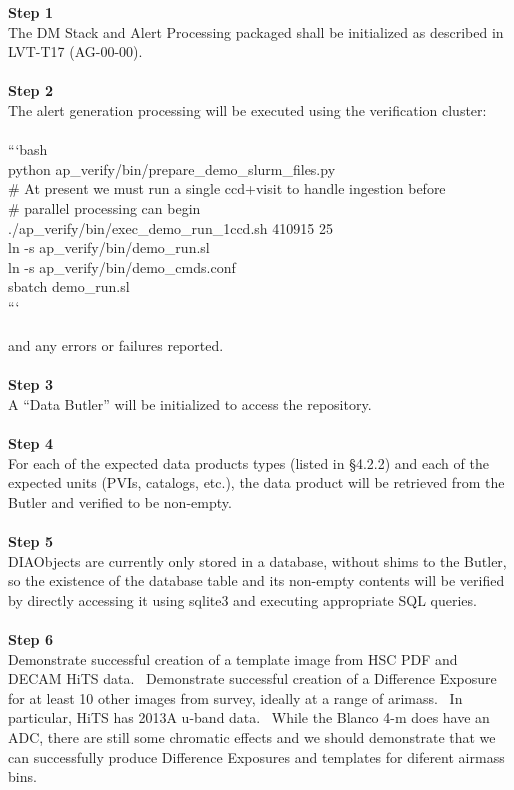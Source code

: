 \textbf{Step 1}\\
The DM Stack and Alert Processing packaged shall be initialized as
described in LVT-T17 (AG-00-00).\\
~\\
\textbf{Step 2}\\
The alert generation processing will be executed using the verification
cluster:\\
~\\
```bash\\
python ap\_verify/bin/prepare\_demo\_slurm\_files.py\\
\# At present we must run a single ccd+visit to handle ingestion
before\\
\# parallel processing can begin\\
./ap\_verify/bin/exec\_demo\_run\_1ccd.sh 410915 25\\
ln -s ap\_verify/bin/demo\_run.sl\\
ln -s ap\_verify/bin/demo\_cmds.conf\\
sbatch demo\_run.sl\\
```\\
~\\
and any errors or failures reported.\\
~\\
\textbf{Step 3}\\
A ``Data Butler'' will be initialized to access the repository.\\
~\\
\textbf{Step 4}\\
For each of the expected data products types (listed in §4.2.2) and each
of the expected units (PVIs, catalogs, etc.), the data product will be
retrieved from the Butler and verified to be non-empty.\\
~\\
\textbf{Step 5}\\
DIAObjects are currently only stored in a database, without shims to the
Butler, so the existence of the database table and its non-empty
contents will be verified by directly accessing it using sqlite3 and
executing appropriate SQL queries.\\
~\\
\textbf{Step 6}\\
Demonstrate successful creation of a template image from HSC PDF and
DECAM HiTS data. ~Demonstrate successful creation of a Difference
Exposure for at least 10 other images from survey, ideally at a range of
arimass. ~In particular, HiTS has 2013A u-band data. ~While the Blanco
4-m does have an ADC, there are still some chromatic effects and we
should demonstrate that we can successfully produce Difference Exposures
and templates for diferent airmass bins.\\
~\\

